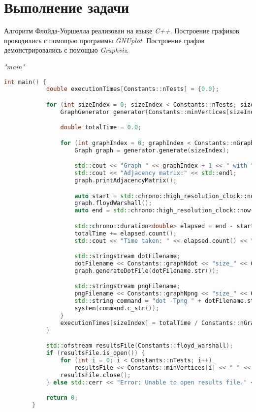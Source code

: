 \documentclass[12pt, a4paper]{report}
\begin{document}
	\newpage

	\section*{Выполнение задачи}
	Алгоритм Флойда-Уоршелла реализован на языке \textit{C++}. Построение графиков проводились с помощью программы \textit{GNUplot}. Построение графов демонстрировались с помощью \textit{Graphviz}.

	\textit{"main"}
	\lstset{style=mystyle}
	\begin{lstlisting}[language=C++]
		int main() {
			double executionTimes[Constants::nTests] = {0.0};

			for (int sizeIndex = 0; sizeIndex < Constants::nTests; sizeIndex++) {
				GraphGenerator generator(Constants::minVertices[sizeIndex], Constants::maxVertices[sizeIndex], Constants::minEdges[sizeIndex], Constants::minEdges[sizeIndex]);

				double totalTime = 0.0;

				for (int graphIndex = 0; graphIndex < Constants::nGraphs; graphIndex++) {
					Graph graph = generator.generate(sizeIndex);

					std::cout << "Graph " << graphIndex + 1 << " with " << Constants::minVertices[sizeIndex] << " vertices:" << std::endl;
					std::cout << "Adjacency matrix:" << std::endl;
					graph.printAdjacencyMatrix();

					auto start = std::chrono::high_resolution_clock::now();
					graph.floydWarshall();
					auto end = std::chrono::high_resolution_clock::now();

					std::chrono::duration<double> elapsed = end - start;
					totalTime += elapsed.count();
					std::cout << "Time taken: " << elapsed.count() << " seconds" << std::endl;

					std::stringstream dotFilename;
					dotFilename << Constants::graphNdot << "size_" << Constants::minVertices[sizeIndex] << "_" << graphIndex + 1 << ".dot";
					graph.generateDotFile(dotFilename.str());

					std::stringstream pngFilename;
					pngFilename << Constants::graphNpng << "size_" << Constants::minVertices[sizeIndex] << "_" << graphIndex + 1 << ".png";
					std::string command = "dot -Tpng " + dotFilename.str() + " -o " + pngFilename.str();
					system(command.c_str());
				}
				executionTimes[sizeIndex] = totalTime / Constants::nGraphs;
			}

			std::ofstream resultsFile(Constants::floyd_warshall);
			if (resultsFile.is_open()) {
				for (int i = 0; i < Constants::nTests; i++)
					resultsFile << Constants::minVertices[i] << " " << executionTimes[i] << std::endl;
				resultsFile.close();
			} else std::cerr << "Error: Unable to open results file." << std::endl;

			return 0;
		}		
	\end{lstlisting}
	\newpage
	\vfill
\end{document}
